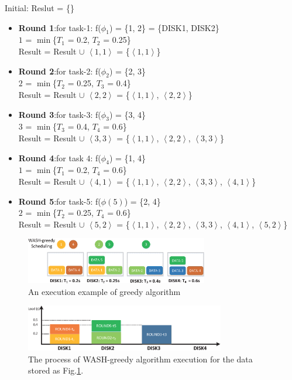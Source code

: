 \documentclass[conference]{IEEEtran}
\begin{document}
Initial: Reslut = \{\}
\begin{itemize}
	\item \textbf{Round 1}:for task-1:
	 f($\phi_1$) = \{1, 2\} = \{DISK1, DISK2\}\\
	 $1$ = $\min$\{$T_1$ = 0.2, $T_2$ = 0.25\}\\
	Result = Result $\cup$ $\left \langle 1, 1\right \rangle$ = \{$\left \langle 1, 1\right \rangle$\}
	\item \textbf{Round 2}:for task-2:
	f($\phi_2$) = \{2, 3\}\\
	$2$ = $\min$\{$T_2$ = 0.25, $T_3$ = 0.4\}\\
	Result = Result $\cup$ $\left \langle 2, 2\right \rangle$ = \{$\left \langle 1, 1\right \rangle$, $\left \langle 2, 2\right \rangle$\}
	\item \textbf{Round 3}:for task-3:
	f($\phi_3$) = \{3, 4\}\\
	$3$ = $\min$\{$T_3$ = 0.4, $T_4$ = 0.6\}\\
	Result = Result $\cup$ $\left \langle 3, 3\right \rangle$ = \{$\left \langle 1, 1\right \rangle$, $\left \langle 2, 2\right \rangle$,  $\left \langle 3, 3\right \rangle$\}
	\item \textbf{Round 4}:for task  $4$:
	f($\phi_4$) = \{1, 4\}\\
	$1$ = $\min$\{$T_1$ = 0.2, $T_4$ = 0.6\}\\
	Result = Result $\cup$ $\left \langle 4, 1\right \rangle$ = \{$\left \langle 1, 1\right \rangle$, $\left \langle 2, 2\right \rangle$,  $\left \langle 3, 3\right \rangle$, $\left \langle 4, 1\right \rangle$\}	
	\item \textbf{Round 5}:for task-5:
	f($\phi(5)$) = \{2, 4\}\\
	$2$ = $\min$\{$T_2$ = 0.25, $T_4$ = 0.6\}\\
	Result = Result $\cup$ $\left \langle 5, 2\right \rangle$ = \{$\left \langle 1, 1\right \rangle$, $\left \langle 2, 2\right \rangle$,  $\left \langle 3, 3\right \rangle$, $\left \langle 4, 1\right \rangle$, $\left \langle 5, 2\right \rangle$\}	
	
\end{itemize}
\begin{figure}[!t]
	\centering
	\includegraphics[height=0.8in]{fig1_9.eps}
	\caption{An execution example of greedy algorithm  }
	\label{fig1}
\end{figure}
\begin{figure}[!t]
	\centering
	\includegraphics[height=0.8in]{fig2_2.eps}
	\caption{The process of WASH-greedy algorithm execution for the data stored as Fig.\ref{fig1}. }
	\label{fig2}
\end{figure}
\end{document}
